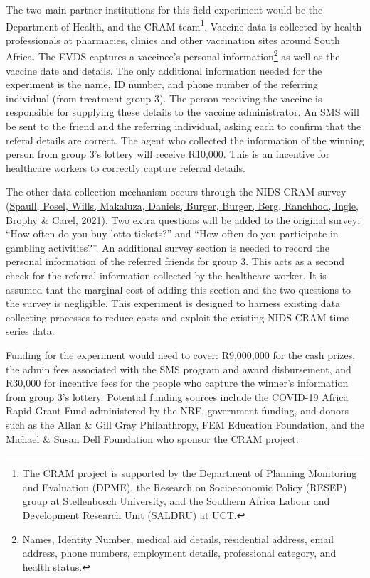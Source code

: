 \documentclass[11pt,preprint, authoryear]{elsarticle}
\numberwithin{equation}{section}
\numberwithin{figure}{section}
\numberwithin{table}{section}
\let\rmarkdownfootnote\footnote%
\def\footnote{\protect\rmarkdownfootnote}
\begin{document}
The two main partner institutions for this field experiment would be the
Department of Health, and the CRAM team\footnote{The CRAM project is
  supported by the Department of Planning Monitoring and Evaluation
  (DPME), the Research on Socioeconomic Policy (RESEP) group at
  Stellenbosch University, and the Southern Africa Labour and
  Development Research Unit (SALDRU) at UCT.}. Vaccine data is collected
by health professionals at pharmacies, clinics and other vaccination
sites around South Africa. The EVDS captures a vaccinee's personal
information\footnote{Names, Identity Number, medical aid details,
  residential address, email address, phone numbers, employment details,
  professional category, and health status.} as well as the vaccine date
and details. The only additional information needed for the experiment
is the name, ID number, and phone number of the referring individual
(from treatment group 3). The person receiving the vaccine is
responsible for supplying these details to the vaccine administrator. An
SMS will be sent to the friend and the referring individual, asking each
to confirm that the referal details are correct. The agent who collected
the information of the winning person from group 3's lottery will
receive R10,000. This is an incentive for healthcare workers to
correctly capture referral details.

The other data collection mechanism occurs through the NIDS-CRAM survey
(\protect\hyperlink{ref-quest}{Spaull, Posel, Wills, Makaluza, Daniels,
Burger, Burger, Berg, Ranchhod, Ingle, Brophy \& Carel, 2021}). Two
extra questions will be added to the original survey: ``How often do you
buy lotto tickets?'' and ``How often do you participate in gambling
activities?''. An additional survey section is needed to record the
personal information of the referred friends for group 3. This acts as a
second check for the referral information collected by the healthcare
worker. It is assumed that the marginal cost of adding this section and
the two questions to the survey is negligible. This experiment is
designed to harness existing data collecting processes to reduce costs
and exploit the existing NIDS-CRAM time series data.

Funding for the experiment would need to cover: R9,000,000 for the cash
prizes, the admin fees associated with the SMS program and award
disbursement, and R30,000 for incentive fees for the people who capture
the winner's information from group 3's lottery. Potential funding
sources include the COVID-19 Africa Rapid Grant Fund administered by the
NRF, government funding, and donors such as the Allan \& Gill Gray
Philanthropy, FEM Education Foundation, and the Michael \& Susan Dell
Foundation who sponsor the CRAM project.
\end{document}
